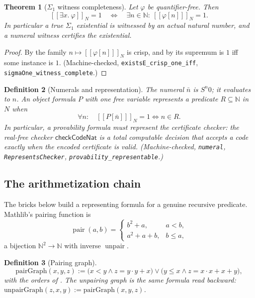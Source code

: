 \documentclass[11pt,a4paper]{article}
\newtheorem{theorem}{Theorem}[section]
\newtheorem{definition}[theorem]{Definition}
\newcommand{\Nat}{\mathbb{N}}
\newcommand{\evalc}[2]{[\![ {#2} ]\!]_{#1}}
\newcommand{\pair}{\operatorname{pair}}
\newcommand{\unpair}{\operatorname{unpair}}
\begin{document}
\begin{theorem}[$\Sigma_1$ witness completeness]
\label{thm:sigma1}
Let $\varphi$ be quantifier-free.
Then
\[
  \evalc{N}{\exists x.\ \varphi} = 1
  \quad\Longleftrightarrow\quad
  \exists n \in \Nat:\ \evalc{N}{\varphi[n]} = 1 .
\]
In particular a true $\Sigma_1$ existential is witnessed by an actual
natural number, and a numeral witness certifies the existential.
\end{theorem}
\begin{proof}
By  the family
$n \mapsto \evalc{N}{\varphi[n]}$ is crisp, and by
 its supremum is $1$ iff some instance is $1$.
(Machine-checked, \texttt{existsE\_crisp\_one\_iff},
\texttt{sigmaOne\_witness\_complete}.)
\end{proof}

\begin{definition}[Numerals and representation]
\label{def:represents}
The numeral $\bar n$ is $S^n 0$; it evaluates to $n$.
An object formula $P$ with one free variable \emph{represents} a
predicate $R \subseteq \Nat$ in $N$ when
\[
  \forall n:\quad \evalc{N}{P[\bar n]} = 1
  \iff n \in R .
\]
In particular, a provability formula must represent the certificate
checker: the real-free checker $\mathsf{checkCodeNat}$ is a total
computable decision that accepts a code exactly when the encoded
certificate is valid.
(Machine-checked, \texttt{numeral}, \texttt{RepresentsChecker},
\texttt{provability\_representable}.)
\end{definition}

\subsection{The arithmetization chain}

The bricks below build a representing formula for a genuine recursive
predicate.
Mathlib's pairing function is
\[
  \pair(a,b) =
  \begin{cases}
    b^2 + a, & a < b,\\
    a^2 + a + b, & b \leq a,
  \end{cases}
\]
a bijection $\Nat^2 \to \Nat$ with inverse $\unpair$.

\begin{definition}[Pairing graph]
\label{def:pairgraph}
\[
  \mathrm{pairGraph}(x,y,z) :=
  \bigl(x < y \wedge z = y \cdot y + x\bigr)
  \vee
  \bigl(y \leq x \wedge z = x \cdot x + x + y\bigr),
\]
with the orders of .
The unpairing graph is the same formula read backward:
$\mathrm{unpairGraph}(z,x,y) := \mathrm{pairGraph}(x,y,z)$.
\end{definition}
\end{document}
